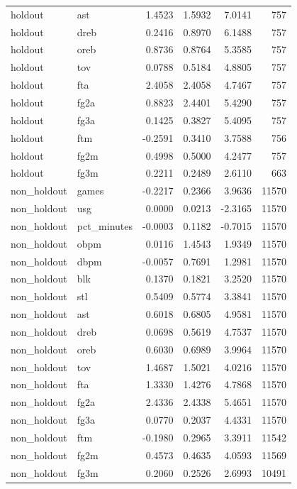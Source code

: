 \begin{table}
\begin{tabular}{llrrrr}
holdout & ast & 1.4523 & 1.5932 & 7.0141 & 757 \\
holdout & dreb & 0.2416 & 0.8970 & 6.1488 & 757 \\
holdout & oreb & 0.8736 & 0.8764 & 5.3585 & 757 \\
holdout & tov & 0.0788 & 0.5184 & 4.8805 & 757 \\
holdout & fta & 2.4058 & 2.4058 & 4.7467 & 757 \\
holdout & fg2a & 0.8823 & 2.4401 & 5.4290 & 757 \\
holdout & fg3a & 0.1425 & 0.3827 & 5.4095 & 757 \\
holdout & ftm & -0.2591 & 0.3410 & 3.7588 & 756 \\
holdout & fg2m & 0.4998 & 0.5000 & 4.2477 & 757 \\
holdout & fg3m & 0.2211 & 0.2489 & 2.6110 & 663 \\
non\_holdout & games & -0.2217 & 0.2366 & 3.9636 & 11570 \\
non\_holdout & usg & 0.0000 & 0.0213 & -2.3165 & 11570 \\
non\_holdout & pct\_minutes & -0.0003 & 0.1182 & -0.7015 & 11570 \\
non\_holdout & obpm & 0.0116 & 1.4543 & 1.9349 & 11570 \\
non\_holdout & dbpm & -0.0057 & 0.7691 & 1.2981 & 11570 \\
non\_holdout & blk & 0.1370 & 0.1821 & 3.2520 & 11570 \\
non\_holdout & stl & 0.5409 & 0.5774 & 3.3841 & 11570 \\
non\_holdout & ast & 0.6018 & 0.6805 & 4.9581 & 11570 \\
non\_holdout & dreb & 0.0698 & 0.5619 & 4.7537 & 11570 \\
non\_holdout & oreb & 0.6030 & 0.6989 & 3.9964 & 11570 \\
non\_holdout & tov & 1.4687 & 1.5021 & 4.0216 & 11570 \\
non\_holdout & fta & 1.3330 & 1.4276 & 4.7868 & 11570 \\
non\_holdout & fg2a & 2.4336 & 2.4338 & 5.4651 & 11570 \\
non\_holdout & fg3a & 0.0770 & 0.2037 & 4.4331 & 11570 \\
non\_holdout & ftm & -0.1980 & 0.2965 & 3.3911 & 11542 \\
non\_holdout & fg2m & 0.4573 & 0.4635 & 4.0593 & 11569 \\
non\_holdout & fg3m & 0.2060 & 0.2526 & 2.6993 & 10491 \\
\bottomrule
\end{tabular}
\end{table}

